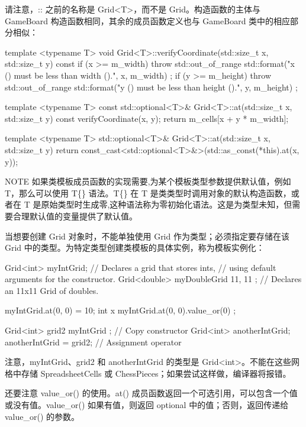 请注意，:: 之前的名称是 Grid<T>，而不是 Grid。构造函数的主体与 GameBoard 构造函数相同，其余的成员函数定义也与 GameBoard 类中的相应部分相似：

\begin{cpp}
template <typename T>
void Grid<T>::verifyCoordinate(std::size_t x, std::size_t y) const
{
    if (x >= m_width) {
        throw std::out_of_range {
            std::format("x ({}) must be less than width ({}).", x, m_width) };
    }
    if (y >= m_height) {
        throw std::out_of_range {
            std::format("y ({}) must be less than height ({}).", y, m_height) };
    }
}

template <typename T>
const std::optional<T>& Grid<T>::at(std::size_t x, std::size_t y) const
{
    verifyCoordinate(x, y);
    return m_cells[x + y * m_width];
}

template <typename T>
std::optional<T>& Grid<T>::at(std::size_t x, std::size_t y)
{
    return const_cast<std::optional<T>&>(std::as_const(*this).at(x, y));
}
\end{cpp}

\begin{myNotic}{NOTE}
如果类模板成员函数的实现需要,为某个模板类型参数提供默认值，例如 T，那么可以使用 T\{\} 语法。T\{\} 在 T 是类类型时调用对象的默认构造函数，或者在 T 是原始类型时生成零,这种语法称为零初始化语法。这是为类型未知，但需要合理默认值的变量提供了默认值。
\end{myNotic}


当想要创建 Grid 对象时，不能单独使用 Grid 作为类型；必须指定要存储在该 Grid 中的类型。为特定类型创建类模板的具体实例，称为模板实例化：

\begin{cpp}
Grid<int> myIntGrid; // Declares a grid that stores ints,
// using default arguments for the constructor.
Grid<double> myDoubleGrid { 11, 11 }; // Declares an 11x11 Grid of doubles.

myIntGrid.at(0, 0) = 10;
int x { myIntGrid.at(0, 0).value_or(0) };

Grid<int> grid2 { myIntGrid }; // Copy constructor
Grid<int> anotherIntGrid;
anotherIntGrid = grid2; // Assignment operator
\end{cpp}

注意，myIntGrid、grid2 和 anotherIntGrid 的类型是 Grid<int>。不能在这些网格中存储 SpreadsheetCells 或 ChessPieces；如果尝试这样做，编译器将报错。

还要注意 value\_or() 的使用。at() 成员函数返回一个可选引用，可以包含一个值或没有值。value\_or() 如果有值，则返回 optional 中的值；否则，返回传递给 value\_or() 的参数。


